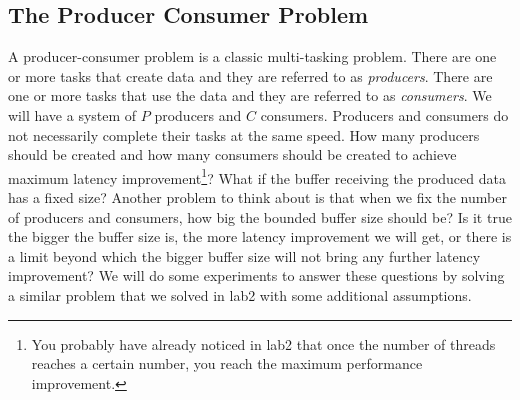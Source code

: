 \subsection{The Producer Consumer Problem}
A producer-consumer problem is a classic multi-tasking problem. There are one or more tasks that create data and they are referred to as {\em producers}. There are one or more tasks that use the data and they are referred to as {\em consumers}. We will have a system of $P$ producers and $C$ consumers. Producers and consumers do not necessarily complete their tasks at the same speed. How many producers should be created and how many consumers should be created to achieve maximum latency improvement\footnote{You probably have already noticed in lab2 that once the number of threads reaches a certain number, you reach the maximum performance improvement.}? What if the buffer receiving the produced data has a fixed size? Another problem to think about is that when we fix the number of producers and consumers, how big the bounded buffer size should be? Is it true the bigger the buffer size is, the more latency improvement we will get, or there is a limit beyond which the bigger buffer size will not bring any further latency improvement? We will do some experiments to answer these questions by solving a similar problem that we solved in lab2 with some additional assumptions.

